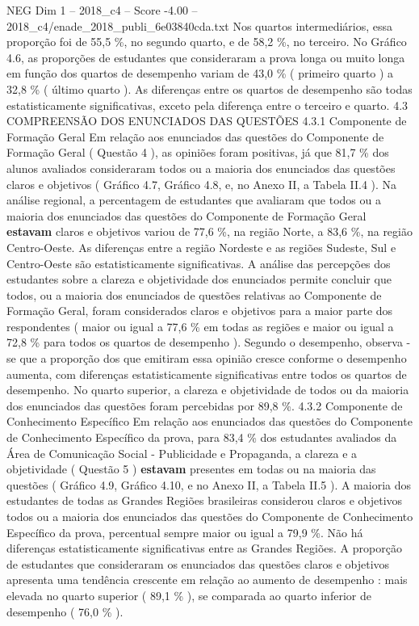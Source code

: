 \begin{textsample}{NEG Dim 1 – 2018\_c4 – Score -4.00 – 2018\_c4/enade\_2018\_publi\_6e03840cda.txt}
Nos quartos intermediários, essa proporção foi de 55,5 \%, no segundo quarto, e de 58,2 \%, no terceiro.
No Gráfico 4.6, as proporções de estudantes que consideraram a prova longa ou muito longa em função dos quartos de desempenho variam de 43,0 \% ( primeiro quarto ) a 32,8 \% ( último quarto ).
As diferenças entre os quartos de desempenho são todas estatisticamente significativas, exceto pela diferença entre o terceiro e quarto. 4.3 COMPREENSÃO DOS ENUNCIADOS DAS QUESTÕES 4.3.1 Componente de Formação Geral Em relação aos enunciados das questões do Componente de Formação Geral ( Questão 4 ), as opiniões foram positivas, já que 81,7 \% dos alunos avaliados consideraram todos ou a maioria dos enunciados das questões claros e objetivos ( Gráfico 4.7, Gráfico 4.8, e, no Anexo II, a Tabela II.4 ).
Na análise regional, a percentagem de estudantes que avaliaram que todos ou a maioria dos enunciados das questões do Componente de Formação Geral \textbf{estavam} claros e objetivos variou de 77,6 \%, na região Norte, a 83,6 \%, na região Centro-Oeste.
As diferenças entre a região Nordeste e as regiões Sudeste, Sul e Centro-Oeste são estatisticamente significativas.
A análise das percepções dos estudantes sobre a clareza e objetividade dos enunciados permite concluir que todos, ou a maioria dos enunciados de questões relativas ao Componente de Formação Geral, foram considerados claros e objetivos para a maior parte dos respondentes ( maior ou igual a 77,6 \% em todas as regiões e maior ou igual a 72,8 \% para todos os quartos de desempenho ).
Segundo o desempenho, observa -se que a proporção dos que emitiram essa opinião cresce conforme o desempenho aumenta, com diferenças estatisticamente significativas entre todos os quartos de desempenho.
No quarto superior, a clareza e objetividade de todos ou da maioria dos enunciados das questões foram percebidas por 89,8 \%. 4.3.2 Componente de Conhecimento Específico Em relação aos enunciados das questões do Componente de Conhecimento Específico da prova, para 83,4 \% dos estudantes avaliados da Área de Comunicação Social - Publicidade e Propaganda, a clareza e a objetividade ( Questão 5 ) \textbf{estavam} presentes em todas ou na maioria das questões ( Gráfico 4.9, Gráfico 4.10, e no Anexo II, a Tabela II.5 ).
A maioria dos estudantes de todas as Grandes Regiões brasileiras considerou claros e objetivos todos ou a maioria dos enunciados das questões do Componente de Conhecimento Específico da prova, percentual sempre maior ou igual a 79,9 \%.
Não há diferenças estatisticamente significativas entre as Grandes Regiões.
A proporção de estudantes que consideraram os enunciados das questões claros e objetivos apresenta uma tendência crescente em relação ao aumento de desempenho : mais elevada no quarto superior ( 89,1 \% ), se comparada ao quarto inferior de desempenho ( 76,0 \% ).

\end{textsample}
